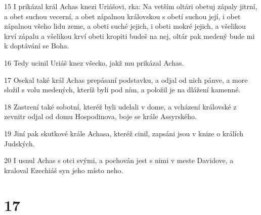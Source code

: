 \par 15 I prikázal král Achas knezi Uriášovi, rka: Na vetším oltári obetuj zápaly jitrní, a obet suchou vecerní, a obet zápalnou královskou s obetí suchou její, i obet zápalnou všeho lidu zeme, a obeti suché jejich, i obeti mokré jejich, a všelikou krví zápalu a všelikou krví obeti kropiti budeš na nej, oltár pak medený bude mi k doptávání se Boha.
\par 16 Tedy ucinil Uriáš knez všecko, jakž mu prikázal Achas.
\par 17 Osekal také král Achas prepásaní podstavku, a odjal od nich pánve, a more složil s volu medených, kteríž byli pod ním, a položil je na dlážení kamenné.
\par 18 Zastrení také sobotní, kteréž byli udelali v dome, a vcházení královské z zevnitr odjal od domu Hospodinova, boje se krále Assyrského.
\par 19 Jiní pak skutkové krále Achasa, kteréž cinil, zapsáni jsou v knize o králích Judských.
\par 20 I usnul Achas s otci svými, a pochován jest s nimi v meste Davidove, a kraloval Ezechiáš syn jeho místo neho.

\chapter{17}

